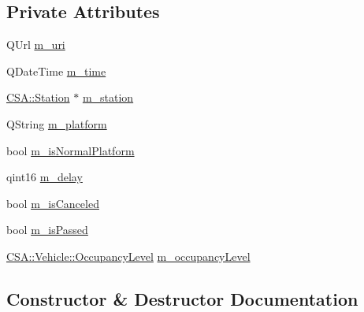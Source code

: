 \subsection*{Private Attributes}
\begin{DoxyCompactItemize}
\item 
Q\+Url \mbox{\hyperlink{classCSA_1_1RouteLegEnd_a83202a0b6715895126d9bf11a9315279}{m\+\_\+uri}}
\item 
Q\+Date\+Time \mbox{\hyperlink{classCSA_1_1RouteLegEnd_a7572b34abc0d4f550706fee4558345d3}{m\+\_\+time}}
\item 
\mbox{\hyperlink{classCSA_1_1Station}{C\+S\+A\+::\+Station}} $\ast$ \mbox{\hyperlink{classCSA_1_1RouteLegEnd_ade143e56b08c85418c7d9353b1c80288}{m\+\_\+station}}
\item 
Q\+String \mbox{\hyperlink{classCSA_1_1RouteLegEnd_aacea60490b5bf82eb303fdaa8d8ac709}{m\+\_\+platform}}
\item 
bool \mbox{\hyperlink{classCSA_1_1RouteLegEnd_a0abd8fa004d9f7959233463145be24f0}{m\+\_\+is\+Normal\+Platform}}
\item 
qint16 \mbox{\hyperlink{classCSA_1_1RouteLegEnd_a426fe66c5e08f15f4617d6fd6a436199}{m\+\_\+delay}}
\item 
bool \mbox{\hyperlink{classCSA_1_1RouteLegEnd_a4ab0c3a3c545b376825bc3925c5b173b}{m\+\_\+is\+Canceled}}
\item 
bool \mbox{\hyperlink{classCSA_1_1RouteLegEnd_a739016bc10cc838f486d1fa37436ed43}{m\+\_\+is\+Passed}}
\item 
\mbox{\hyperlink{classCSA_1_1Vehicle_a331cc81107e5f0a8f37f894729dd9bda}{C\+S\+A\+::\+Vehicle\+::\+Occupancy\+Level}} \mbox{\hyperlink{classCSA_1_1RouteLegEnd_add4c875dfb78e698999c16963e17ee41}{m\+\_\+occupancy\+Level}}
\end{DoxyCompactItemize}


\subsection{Constructor \& Destructor Documentation}
\mbox{\label{classCSA_1_1RouteLegEnd_a209849fda86c0e85e7c5b6b740471679}} 
